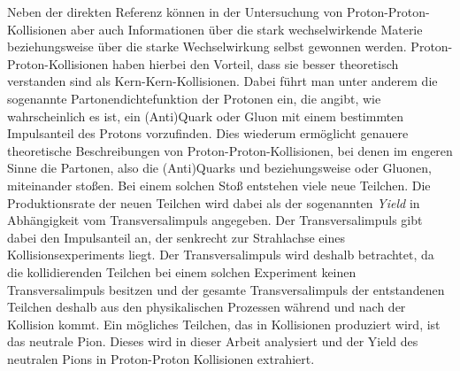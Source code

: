 Neben der direkten Referenz k\"onnen in der Untersuchung von Proton-Proton-Kollisionen aber auch Informationen \"uber die stark wechselwirkende Materie beziehungsweise \"uber die starke Wechselwirkung selbst gewonnen werden.
Proton-Proton-Kollisionen haben hierbei den Vorteil, dass sie besser theoretisch verstanden sind als Kern-Kern-Kollisionen.
Dabei f\"uhrt man unter anderem die sogenannte Partonendichtefunktion der Protonen ein, die angibt, wie wahrscheinlich es ist, ein (Anti)Quark oder Gluon mit einem bestimmten Impulsanteil des Protons vorzufinden.
Dies wiederum erm\"oglicht genauere theoretische Beschreibungen von Proton-Proton-Kollisionen, bei denen im engeren Sinne die Partonen, also die (Anti)Quarks und beziehungsweise oder Gluonen, miteinander sto{\ss}en.
\newline
Bei einem solchen Sto{\ss} entstehen viele neue Teilchen.
Die Produktionsrate der neuen Teilchen wird dabei als der sogenannten \textit{Yield} in Abh\"angigkeit vom Transversalimpuls angegeben.
Der Transversalimpuls gibt dabei den Impulsanteil an, der senkrecht zur Strahlachse eines Kollisionsexperiments liegt.
Der Transversalimpuls wird deshalb betrachtet, da die kollidierenden Teilchen bei einem solchen Experiment keinen Transversalimpuls besitzen und der gesamte Transversalimpuls der entstandenen Teilchen deshalb aus den physikalischen Prozessen w\"ahrend und nach der Kollision kommt.
\newline
Ein m\"ogliches Teilchen, das in Kollisionen produziert wird, ist das neutrale Pion.
Dieses wird in dieser Arbeit analysiert und der Yield des neutralen Pions in Proton-Proton Kollisionen extrahiert.
